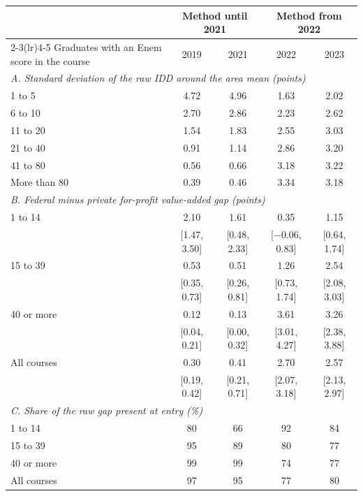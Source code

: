 \begin{tabular}{lcccc}
\toprule
 & \multicolumn{2}{c}{Method until 2021} & \multicolumn{2}{c}{Method from 2022} \\
\cmidrule(lr){2-3}\cmidrule(lr){4-5}
Graduates with an Enem score in the course & 2019 & 2021 & 2022 & 2023 \\
\midrule
\multicolumn{5}{l}{\textit{A. Standard deviation of the raw IDD around the area mean (points)}} \\
1 to 5 & 4.72 & 4.96 & 1.63 & 2.02 \\
6 to 10 & 2.70 & 2.86 & 2.23 & 2.62 \\
11 to 20 & 1.54 & 1.83 & 2.55 & 3.03 \\
21 to 40 & 0.91 & 1.14 & 2.86 & 3.20 \\
41 to 80 & 0.56 & 0.66 & 3.18 & 3.22 \\
More than 80 & 0.39 & 0.46 & 3.34 & 3.18 \\
\midrule
\multicolumn{5}{l}{\textit{B. Federal minus private for-profit value-added gap (points)}} \\
1 to 14 & 2.10 & 1.61 & 0.35 & 1.15 \\
 & \scriptsize[1.47, 3.50] & \scriptsize[0.48, 2.33] & \scriptsize[$-$0.06, 0.83] & \scriptsize[0.64, 1.74] \\
15 to 39 & 0.53 & 0.51 & 1.26 & 2.54 \\
 & \scriptsize[0.35, 0.73] & \scriptsize[0.26, 0.81] & \scriptsize[0.73, 1.74] & \scriptsize[2.08, 3.03] \\
40 or more & 0.12 & 0.13 & 3.61 & 3.26 \\
 & \scriptsize[0.04, 0.21] & \scriptsize[0.00, 0.32] & \scriptsize[3.01, 4.27] & \scriptsize[2.38, 3.88] \\
All courses & 0.30 & 0.41 & 2.70 & 2.57 \\
 & \scriptsize[0.19, 0.42] & \scriptsize[0.21, 0.71] & \scriptsize[2.07, 3.18] & \scriptsize[2.13, 2.97] \\
\midrule
\multicolumn{5}{l}{\textit{C. Share of the raw gap present at entry (\%)}} \\
1 to 14 & 80 & 66 & 92 & 84 \\
15 to 39 & 95 & 89 & 80 & 77 \\
40 or more & 99 & 99 & 74 & 77 \\
All courses & 97 & 95 & 77 & 80 \\
\bottomrule
\end{tabular}